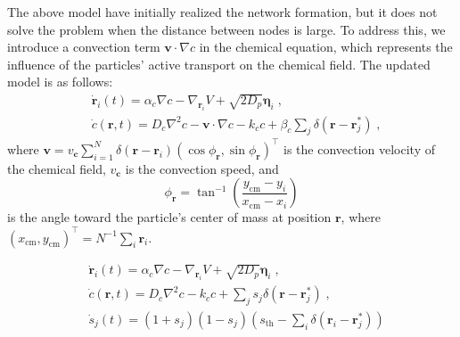 \documentclass{article}
\begin{document}
The above model have initially realized the network formation, but it does not solve the problem when the distance between nodes is large. To address this, we introduce a convection term $\mathbf{v}\cdot \nabla c$ in the chemical equation, which represents the influence of the particles' active transport on the chemical field. The updated model is as follows:
\begin{subequations}
    \begin{align}
        &\dot{\mathbf{r}}_i\left( t \right) =\alpha _c\nabla c-\nabla _{\mathbf{r}_i}V+\sqrt{2D_p}\boldsymbol{\eta }_i\;,\\
        &\dot{c}\left( \mathbf{r},t \right) =D_c\nabla ^2c-\mathbf{v}\cdot \nabla c-k_c c+\beta _c\sum\nolimits_j^{}{\delta \left( \mathbf{r}-\mathbf{r}_{j}^{*} \right) }\;,
    \end{align}
\end{subequations}
where $\mathbf{v}=v_{\boldsymbol{c}}\sum_{i=1}^N{\delta \left( \mathbf{r}-\mathbf{r}_i \right)\left( \cos \phi _{\mathbf{r}}, \sin \phi _{\mathbf{r}} \right) ^{\top}}$ is the convection velocity of the chemical field, $v_{\boldsymbol{c}}$ is the convection speed, and 
\begin{equation}
    \phi _{\mathbf{r}}= \tan^{-1} \left( \frac{y_{\mathrm{cm}}-y_i}{x_{\mathrm{cm}}-x_i} \right)
\end{equation}
is the angle toward the particle's center of mass at position $\mathbf{r}$, where $\left( x_{\mathrm{cm}},y_{\mathrm{cm}} \right) ^{\top}=N^{-1}\sum\nolimits_i^{}{\mathbf{r}_i}$.


\begin{subequations}
    \begin{align}
        &\mathbf{\dot{r}}_i\left( t \right) =\alpha _c\nabla c-\nabla _{\mathbf{r}_i}V+\sqrt{2D_p}\boldsymbol{\eta }_i\;,
        \\
        &\dot{c}\left( \mathbf{r},t \right) =D_c\nabla ^2c-k_cc+\sum\nolimits_j^{}{s_j\delta \left( \mathbf{r}-\mathbf{r}_{j}^{*} \right)}\;,
        \\
        &\dot{s}_j\left( t \right) =\left( 1+s_j \right) \left( 1-s_j \right) \left( s_{\text{th}}-\sum\nolimits_i^{}{\delta \left( \mathbf{r}_i-\mathbf{r}_{j}^{*} \right)} \right) 
    \end{align}
\end{subequations}
\end{document}

